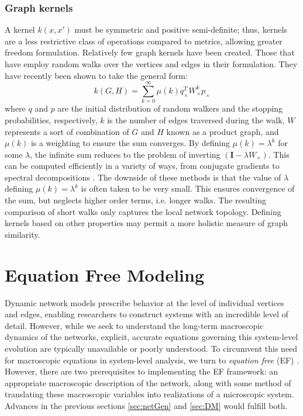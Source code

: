 \documentclass[11pt]{article}
\begin{document}
\subsubsection{Graph kernels}
\indent A kernel $k(x,x')$ must be symmetric and positive semi-definite; thus, kernels are a less restrictive class of operations compared to metrics, allowing greater freedom formulation. Relatively few graph kernels have been created. Those that have employ random walks over the vertices and edges in their formulation. They have recently been shown to take the general form:
\[
k(G,H) = \sum\limits_{k=0}^{\infty}\mu(k)q_{\times}^{T}W_{\times}^{k}p_{\times}
\]
where $q$ and $p$ are the initial distribution of random walkers and the stopping probabilities, respectively, $k$ is the number of edges traversed during the walk, $W$ represents a sort of combination of $G$ and $H$ known as a product graph, and $\mu(k)$ is a weighting to ensure the sum converges. By defining $\mu(k) = \lambda^{k}$ for some $\lambda$, the infinite sum reduces to the problem of inverting $( \textbf{I} - \lambda W_{\times} )$. This can be computed efficiently in a variety of ways, from conjugate gradients to spectral decompositions \cite{Borgwardt2008}. The downside of these methods is that the value of $\lambda$ defining $\mu(k) = \lambda^{k}$ is often taken to be very small. This ensures convergence of the sum, but neglects higher order terms, i.e. longer walks. The resulting comparison of short walks only captures the local network topology. Defining kernels based on other properties may permit a more holistic measure of graph similarity.
\section{Equation Free Modeling}
\label{sec:EF}
\indent Dynamic network models prescribe behavior at the level of individual vertices and edges, enabling researchers to construct systems with an incredible level of detail. However, while we seek to understand the long-term macroscopic dynamics of the networks, explicit, accurate equations governing this system-level evolution are typically unavailable or poorly understood. To circumvent this need for macroscopic equations in system-level analysis, we turn to \textit{equation free} (EF) . However, there are two prerequisites to implementing the EF framework: an appropriate macroscopic description of the network, along with some method of translating these macroscopic variables into realizations of a microscopic system. Advances in the previous sections \ref{sec:netGen} and \ref{sec:DM} would fulfill both. 
\end{document}
